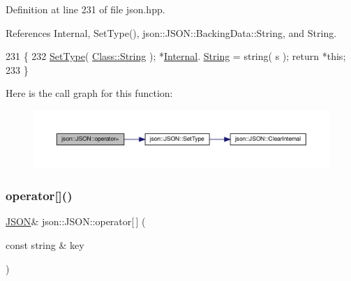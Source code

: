 Definition at line 231 of file json.\+hpp.



References Internal, Set\+Type(), json\+::\+J\+S\+O\+N\+::\+Backing\+Data\+::\+String, and String.


\begin{DoxyCode}
231                                                                                           \{
232                 \mbox{\hyperlink{classjson_1_1_j_s_o_n_a668500208950e48394fc8bfe7c320205}{SetType}}( \mbox{\hyperlink{classjson_1_1_j_s_o_n_a762f55df6d407c1af61607ed516ffe07a27118326006d3829667a400ad23d5d98}{Class::String}} ); *\mbox{\hyperlink{classjson_1_1_j_s_o_n_a1e2a064794c3d55c8bb8887fc5734947}{Internal}}.
      \mbox{\hyperlink{unionjson_1_1_j_s_o_n_1_1_backing_data_a883c18d113d2e55767a9530f06a9c772}{String}} = string( s ); \textcolor{keywordflow}{return} *\textcolor{keyword}{this};
233             \}
\end{DoxyCode}
Here is the call graph for this function\+:
\nopagebreak
\begin{figure}[H]
\begin{center}
\leavevmode
\includegraphics[width=350pt]{classjson_1_1_j_s_o_n_ab2dd5163c63d60978a2067a2c1ba50ee_cgraph}
\end{center}
\end{figure}
\mbox{\label{classjson_1_1_j_s_o_n_a29c695c67a5b34a3b59af0da3c25d6b1}} 
\subsubsection{\texorpdfstring{operator[]()}{operator[]()}\hspace{0.1cm}{\footnotesize\ttfamily [1/2]}}
{\footnotesize\ttfamily \mbox{\hyperlink{classjson_1_1_j_s_o_n}{J\+S\+ON}}\& json\+::\+J\+S\+O\+N\+::operator\mbox{[}$\,$\mbox{]} (\begin{DoxyParamCaption}\item[{const string \&}]{key }\end{DoxyParamCaption})\hspace{0.3cm}{\ttfamily [inline]}}



